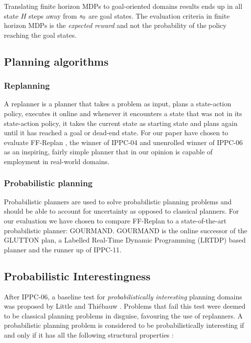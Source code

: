 \documentclass[runningheads,a4paper]{llncs}
\begin{document}
Translating finite horizon MDPs to goal-oriented domains results ends up in all state $H$ steps away from $s\textsubscript{0}$ are goal states. The evaluation criteria in finite horizon MDPs is the \emph{expected reward} and not the probability of the policy reaching the goal states.

\subsection{Planning algorithms}
\subsubsection{Replanning}
A replanner is a planner that takes a problem as input, plans a state-action policy, executes it online and whenever it encounters a state that was not in its state-action policy, it takes the current state as starting state and plans again until it has reached a goal or dead-end state. For our paper have chosen to evaluate FF-Replan \cite{FFReplan}, the winner of IPPC-04 and unenrolled winner of IPPC-06 as an inspiring, fairly simple planner that in our opinion is capable of employment in real-world domains.

\subsubsection{Probabilistic planning}
Probabilistic planners are used to solve probabilistic planning problems and should be able to account for uncertainty as opposed to classical planners. For our evaluation we have chosen to compare FF-Replan to a state-of-the-art probabilistic planner: GOURMAND. GOURMAND is the online successor of the GLUTTON plan, a Labelled Real-Time Dynamic Programming (LRTDP) based planner and the runner up of IPPC-11.

\subsection{Probabilistic Interestingness}
After IPPC-06, a baseline test for \emph{probabilistically interesting} planning domains was proposed by Little and Thi\'ebauw \cite{little2007probvsreplan}.  Problems that fail this test were deemed to be classical planning problems in disguise, favouring the use of replanners. A probabilistic planning problem is considered to be probabilistically interesting if and only if it has all the following structural properties \cite{little2007probvsreplan}:
\end{document}
